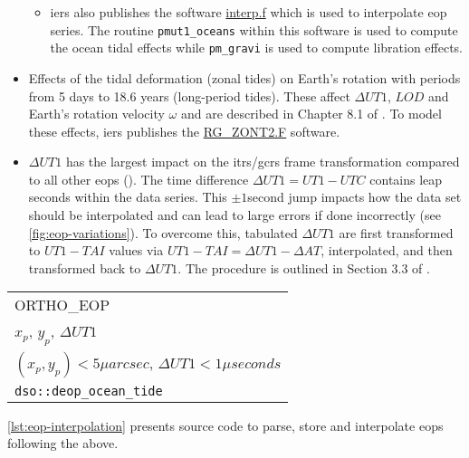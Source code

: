 \begin{itemize}
\begin{itemize}
      \item \gls{iers} also publishes the software 
       \href{https://hpiers.obspm.fr/iers/models/interp.f}{interp.f} 
        which is used to interpolate \gls{eop} series. The routine \texttt{pmut1\_oceans} 
        within this software is used to compute the ocean tidal effects while 
        \texttt{pm\_gravi} is used to compute libration effects.

    \end{itemize}

    \item Effects of the tidal deformation (zonal tides) on Earth’s rotation with 
      periods from 5 days to 18.6 years (long-period tides). These affect 
      $\Delta UT1$, $LOD$ and Earth's rotation velocity $\omega$ and are 
      described in Chapter 8.1 of \cite{iers2010}. To model these effects, \gls{iers} 
      publishes the \href{https://iers-conventions.obspm.fr/content/chapter8/software/RG_ZONT2.F}{RG\_ZONT2.F} 
      software.

    \item $\Delta UT1$ has the largest impact on the \gls{itrs}/\gls{gcrs} frame 
      transformation compared to all other \glspl{eop} (\cite{Bradley2016}).  The 
      time difference $\Delta UT1 = UT1-UTC$ contains leap seconds within the data 
      series. This $\pm 1$second jump impacts how the data set should be 
      interpolated and can lead to large errors if done incorrectly (see \autoref{fig:eop-variations}). 
      To overcome this, tabulated $\Delta UT1$ are first transformed to $UT1-TAI$ 
      values via $UT1 - TAI = \Delta UT1 - \Delta AT$, interpolated, and then 
      transformed back to $\Delta UT1$. The procedure is outlined in Section 3.3 of 
      \cite{Bradley2016}.

\end{itemize}

\begin{tabular}{}
 ORTHO_EOP & \\
 $x_p$, $y_p$, $\Delta UT1$ & \\
 \hline
 $(x_p, y_p) < 5\mu arcsec$, $\Delta UT1 < 1\mu seconds$ & \\
 \texttt{dso::deop_ocean_tide} & \\
 \hline
\end{tabular}

\autoref{lst:eop-interpolation} presents source code to parse, store and 
interpolate \glspl{eop} following the above.

